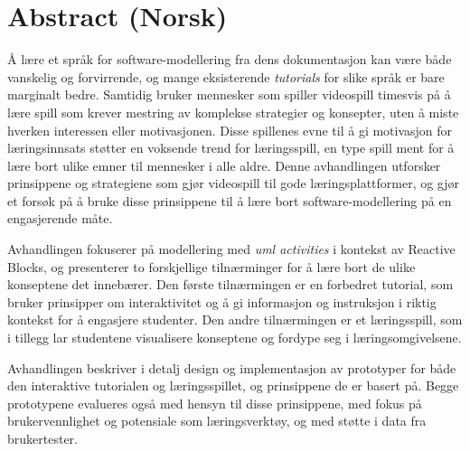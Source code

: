 \chapter*{Abstract (Norsk)}
Å lære et språk for software-modellering fra dens dokumentasjon kan være både vanskelig og forvirrende, og mange eksisterende \emph{tutorials} for slike språk er bare marginalt bedre. Samtidig bruker mennesker som spiller videospill timesvis på å lære spill som krever mestring av komplekse strategier og konsepter, uten å miste hverken interessen eller motivasjonen. Disse spillenes evne til å gi motivasjon for læringsinnsats støtter en voksende trend for læringsspill, en type spill ment for å lære bort ulike emner til mennesker i alle aldre. Denne avhandlingen utforsker prinsippene og strategiene som gjør videospill til gode læringsplattformer, og gjør et forsøk på å bruke disse prinsippene til å lære bort software-modellering på en engasjerende måte.

\noindent
Avhandlingen fokuserer på modellering med \emph{\gls{uml} activities} i kontekst av Reactive Blocks, og presenterer to forskjellige tilnærminger for å lære bort de ulike konseptene det innebærer. Den første tilnærmingen er en forbedret tutorial, som bruker prinsipper om interaktivitet og å gi informasjon og instruksjon i riktig kontekst for å engasjere studenter. Den andre tilnærmingen er et læringsspill, som i tillegg lar studentene visualisere konseptene og fordype seg i læringsomgivelsene.

\noindent
Avhandlingen beskriver i detalj design og implementasjon av prototyper for både den interaktive tutorialen og læringsspillet, og prinsippene de er basert på. Begge proto\-typene evalueres også med hensyn til disse prinsippene, med fokus på brukervennlighet og potensiale som læringsverktøy, og med støtte i data fra brukertester.